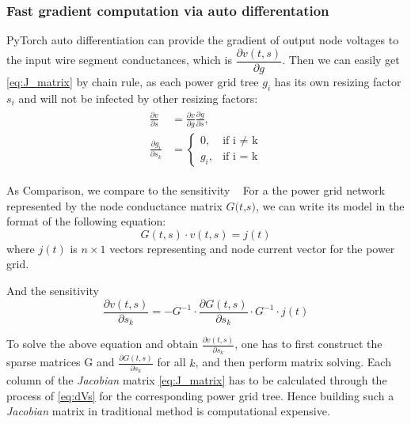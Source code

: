 \subsubsection{Fast gradient computation via auto differentation}
PyTorch auto differentiation can provide the gradient of output node voltages to the input wire segment conductances, which is $ \dfrac{\partial v(t, s)}{\partial g}$. Then we can easily get \eqref{eq:J_matrix} by chain rule, as each power grid tree $g_{i}$ has its own resizing factor $s_{i}$ and will not be infected by other resizing factors:
\begin{equation}
	\label{eq:chain_rule}
	\begin{aligned}
	\begin{split}
	\frac{\partial v}{\partial s} & =\frac{\partial v}{\partial g} \frac{\partial g}{\partial s}, \\ 
	\frac{\partial g_{i}}{\partial s_{k}} & = 
    	\begin{cases}
        		0,      &\mbox{if i $\neq$ k} \\ 
        		g_{i},  &\mbox{if i = k} 
    	\end{cases}
	\end{split}
	\end{aligned}
\end{equation}

As Comparison, we compare to the sensitivity ~\cite{Sukharev:2019pg}
For a the power grid network represented by the node conductance matrix $ \textit{G(t,s)}$, we can write its model in the format of the following equation:
\begin{equation}
	\label{eq:gv=i}
	G(t,s)\cdot v(t,s)= j(t)
\end{equation}
where $j(t)$  is $n\times 1$ vectors representing and node current vector for the power grid.

And the sensitivity 
\begin{equation}
	\label{eq:dVs}
	\dfrac{\partial v(t,s)}{\partial s_{k}} = -G^{-1}\cdot \dfrac{\partial G(t,s)}{\partial s_{k}}  \cdot G^{-1}\cdot j(t)
\end{equation}

To solve the above equation and obtain $ \frac{\partial v(t,s)}{\partial s_{k}}$, one has to first construct the sparse matrices G and $\frac{\partial G(t,s)}{\partial s_{k}}$ for all $k$, and then perform matrix solving. 
Each column of the  \textit{Jacobian} matrix \eqref{eq:J_matrix} has to be calculated through the process of \eqref{eq:dVs} for the corresponding power grid tree. Hence building such a \textit{Jacobian} matrix in traditional method is computational expensive.






